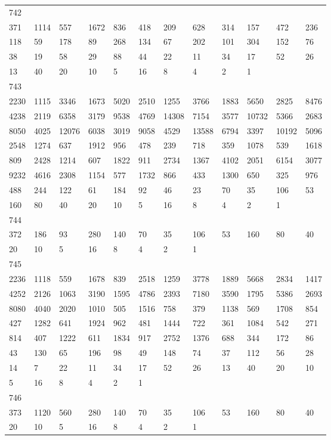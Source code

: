 \begin{longtable}{llllllllllll}
742&&&&&&&&&&&\\
371& 1114& 557& 1672& 836& 418& 209& 628& 314& 157& 472& 236\\
118& 59& 178& 89& 268& 134& 67& 202& 101& 304& 152& 76\\
38& 19& 58& 29& 88& 44& 22& 11& 34& 17& 52& 26\\
13& 40& 20& 10& 5& 16& 8& 4& 2& 1& \\

743&&&&&&&&&&&\\
2230& 1115& 3346& 1673& 5020& 2510& 1255& 3766& 1883& 5650& 2825& 8476\\
4238& 2119& 6358& 3179& 9538& 4769& 14308& 7154& 3577& 10732& 5366& 2683\\
8050& 4025& 12076& 6038& 3019& 9058& 4529& 13588& 6794& 3397& 10192& 5096\\
2548& 1274& 637& 1912& 956& 478& 239& 718& 359& 1078& 539& 1618\\
809& 2428& 1214& 607& 1822& 911& 2734& 1367& 4102& 2051& 6154& 3077\\
9232& 4616& 2308& 1154& 577& 1732& 866& 433& 1300& 650& 325& 976\\
488& 244& 122& 61& 184& 92& 46& 23& 70& 35& 106& 53\\
160& 80& 40& 20& 10& 5& 16& 8& 4& 2& 1& \\

744&&&&&&&&&&&\\
372& 186& 93& 280& 140& 70& 35& 106& 53& 160& 80& 40\\
20& 10& 5& 16& 8& 4& 2& 1& \\

745&&&&&&&&&&&\\
2236& 1118& 559& 1678& 839& 2518& 1259& 3778& 1889& 5668& 2834& 1417\\
4252& 2126& 1063& 3190& 1595& 4786& 2393& 7180& 3590& 1795& 5386& 2693\\
8080& 4040& 2020& 1010& 505& 1516& 758& 379& 1138& 569& 1708& 854\\
427& 1282& 641& 1924& 962& 481& 1444& 722& 361& 1084& 542& 271\\
814& 407& 1222& 611& 1834& 917& 2752& 1376& 688& 344& 172& 86\\
43& 130& 65& 196& 98& 49& 148& 74& 37& 112& 56& 28\\
14& 7& 22& 11& 34& 17& 52& 26& 13& 40& 20& 10\\
5& 16& 8& 4& 2& 1& \\

746&&&&&&&&&&&\\
373& 1120& 560& 280& 140& 70& 35& 106& 53& 160& 80& 40\\
20& 10& 5& 16& 8& 4& 2& 1& \\


\end{longtable}
